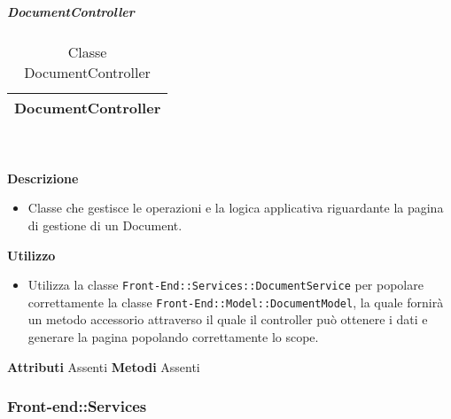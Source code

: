 			\subparagraph{DocumentController} 
\begin{table}[ht]
\begin{center}
\bgroup
	\setlength{\arrayrulewidth}{0.6mm}
	\def\arraystretch{1}
		\begin{tabular}{ | p{12cm} | }
				\hline  
					\centerline{\textbf{DocumentController}}
		\\ \hline 
				\hline
				\hline
		
		\end{tabular}
\egroup
\caption{Classe DocumentController}
\end{center}
\end{table} \textbf{\\ \\ Descrizione}
\begin{itemize}
\item[] Classe che gestisce le operazioni e la logica applicativa riguardante la pagina di gestione di un Document.
\end{itemize} 
\textbf{Utilizzo}
\begin{itemize}
\item[] Utilizza la classe \texttt{Front-End::Services::DocumentService} per popolare correttamente la classe \texttt{Front-End::Model::DocumentModel}, la quale fornirà un metodo accessorio attraverso il quale il controller può ottenere i dati e generare la pagina popolando correttamente lo scope.
\end{itemize}
\textbf{Attributi}
Assenti
\textbf{Metodi}
Assenti

	\subsubsection{Front-end::Services} 
